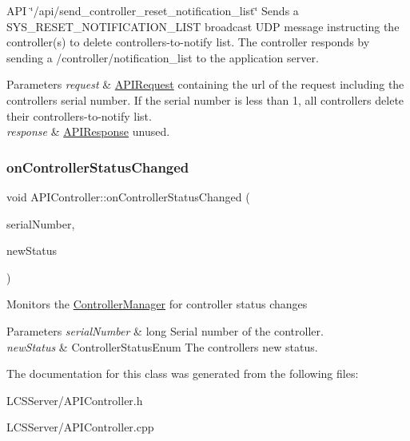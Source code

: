 A\+PI \char`\"{}/api/send\+\_\+controller\+\_\+reset\+\_\+notification\+\_\+list\char`\"{} Sends a S\+Y\+S\+\_\+\+R\+E\+S\+E\+T\+\_\+\+N\+O\+T\+I\+F\+I\+C\+A\+T\+I\+O\+N\+\_\+\+L\+I\+ST broadcast U\+DP message instructing the controller(s) to delete controllers-\/to-\/notify list. The controller responds by sending a /controller/notification\+\_\+list to the application server. 
\begin{DoxyParams}{Parameters}
{\em request} & \hyperlink{class_a_p_i_request}{A\+P\+I\+Request} containing the url of the request including the controller\textquotesingle{}s serial number. If the serial number is less than 1, all controllers delete their controllers-\/to-\/notify list. \\
\hline
{\em response} & \hyperlink{class_a_p_i_response}{A\+P\+I\+Response} unused. \\
\hline
\end{DoxyParams}
\mbox{\label{class_a_p_i_controller_a37992872aeb294f51ca323cc25075f69}} 
\subsubsection{\texorpdfstring{on\+Controller\+Status\+Changed}{onControllerStatusChanged}}
{\footnotesize\ttfamily void A\+P\+I\+Controller\+::on\+Controller\+Status\+Changed (\begin{DoxyParamCaption}\item[{long}]{serial\+Number,  }\item[{\hyperlink{_global_defs_8h_a51207b6a49e0da6f9978a3019d93480a}{Controller\+Status\+Enum}}]{new\+Status }\end{DoxyParamCaption})\hspace{0.3cm}{\ttfamily [slot]}}

Monitors the \hyperlink{class_controller_manager}{Controller\+Manager} for controller status changes 
\begin{DoxyParams}{Parameters}
{\em serial\+Number} & long Serial number of the controller. \\
\hline
{\em new\+Status} & Controller\+Status\+Enum The controller\textquotesingle{}s new status. \\
\hline
\end{DoxyParams}


The documentation for this class was generated from the following files\+:\begin{DoxyCompactItemize}
\item 
L\+C\+S\+Server/A\+P\+I\+Controller.\+h\item 
L\+C\+S\+Server/A\+P\+I\+Controller.\+cpp\end{DoxyCompactItemize}
